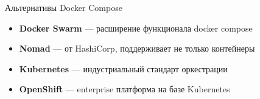 \documentclass[aspectratio=169]{beamer}
\begin{document}
    \begin{frame}{Альтернативы Docker Compose}
        \begin{itemize}
            \item \textbf{Docker Swarm} — расширение функционала docker compose
            \item \textbf{Nomad} — от HashiCorp, поддерживает не только контейнеры
            \item \textbf{Kubernetes} — индустриальный стандарт оркестрации
            \item \textbf{OpenShift} — enterprise платформа на базе Kubernetes
        \end{itemize}
    \end{frame}
\end{document}
